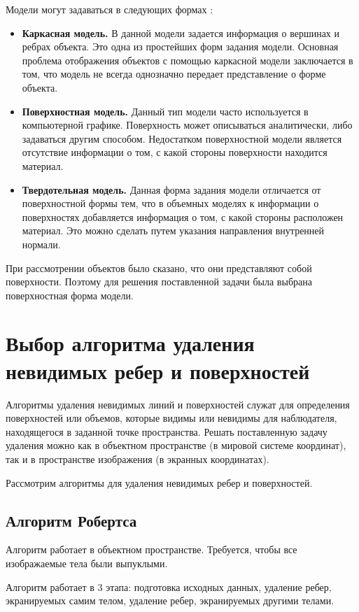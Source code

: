 Модели могут задаваться в следующих формах \cite{models}:
\begin{itemize}[label=---]
	\item \textbf{Каркасная модель.} В данной модели задается информация о вершинах и ребрах объекта. Это одна из простейших форм задания модели. Основная проблема отображения объектов с помощью каркасной модели заключается в том, что модель не всегда однозначно передает представление о форме объекта.
	\item \textbf{Поверхностная модель.} Данный тип модели часто используется в компьютерной графике. Поверхность может описываться аналитически, либо задаваться другим способом. Недостатком поверхностной модели является отсутствие информации о том, с какой стороны поверхности находится материал.
	\item \textbf{Твердотельная модель.} Данная форма задания модели отличается от поверхностной формы тем, что в объемных моделях к информации о поверхностях добавляется информация о том, с какой стороны расположен материал. Это можно сделать путем указания направления внутренней нормали.
\end{itemize}

При рассмотрении объектов было сказано, что они представляют собой поверхности. Поэтому для решения поставленной задачи была выбрана поверхностная форма модели.

\section{Выбор алгоритма удаления невидимых ребер и поверхностей}

Алгоритмы удаления невидимых линий и поверхностей служат для определения поверхностей или объемов, которые видимы или невидимы для наблюдателя, находящегося в заданной точке пространства. Решать поставленную задачу удаления можно как в объектном пространстве (в мировой системе координат), так и в пространстве изображения (в экранных координатах).

Рассмотрим алгоритмы для удаления невидимых ребер и поверхностей.

\subsection{Алгоритм Робертса}

Алгоритм работает в объектном пространстве. Требуется, чтобы все изображаемые тела были выпуклыми. 

Алгоритм работает в 3 этапа: подготовка исходных данных, удаление ребер, экранируемых самим телом, удаление ребер, экранируемых другими телами.

